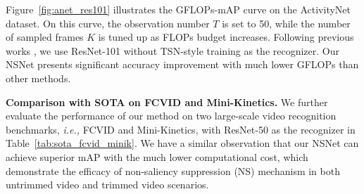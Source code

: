 \documentclass[runningheads]{llncs}
\newcommand{\figref}[1]{Figure~\ref{#1}}
\newcommand{\tabref}[1]{Table~\ref{#1}}
\begin{document}
\figref{fig:anet_res101} illustrates the GFLOPs-mAP curve on the ActivityNet dataset. On this curve, the observation number $T$ is set to 50, while the number of sampled frames $K$ is tuned up as FLOPs budget increases. 
Following previous works \cite{adaframe,liteeval,listentolook,marl}, we use ResNet-101 without TSN-style training as the recognizer.
Our NSNet presents significant accuracy improvement with much lower GFLOPs than other methods.  





\begin{table}[t]
\caption{Comparison with previous methods on FCVID and Mini-Kinetics. Our NSNet consistently outperforms state-of-the-art  in terms of accuracy and efficiency using ResNet-50 as the recognizer.}
\label{tab:sota_fcvid_minik}
\centering
\setlength{\tabcolsep}{8pt}
\end{table} \noindent\textbf{Comparison with SOTA on FCVID and Mini-Kinetics.}
We further evaluate the performance of our method on two large-scale video recognition benchmarks, \emph{i.e.,} FCVID and Mini-Kinetics, with ResNet-50 as the recognizer in \tabref{tab:sota_fcvid_minik}. We have a similar observation that our NSNet can achieve superior mAP with the much lower computational cost, which demonstrate the efficacy of non-saliency suppression (NS) mechanism in both untrimmed video and trimmed video scenarios.
\end{document}
